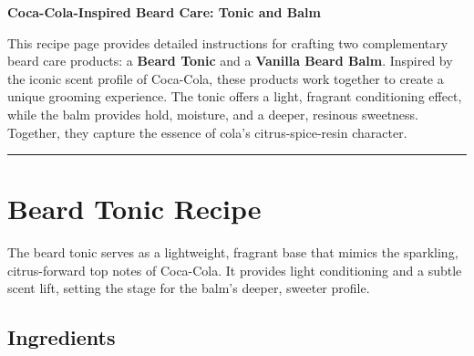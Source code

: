 \documentclass{article}
\begin{document}
\begin{center}
\LARGE\textbf{\textcolor{cola}{Coca-Cola-Inspired Beard Care: Tonic and Balm}}
\end{center}

\vspace{1em}

This recipe page provides detailed instructions for crafting two complementary beard care products: a \textbf{Beard Tonic} and a \textbf{Vanilla Beard Balm}. Inspired by the iconic scent profile of Coca-Cola, these products work together to create a unique grooming experience. The tonic offers a light, fragrant conditioning effect, while the balm provides hold, moisture, and a deeper, resinous sweetness. Together, they capture the essence of cola's citrus-spice-resin character.

\vspace{1em}
\hrule
\vspace{1em}

\section*{Beard Tonic Recipe}

The beard tonic serves as a lightweight, fragrant base that mimics the sparkling, citrus-forward top notes of Coca-Cola. It provides light conditioning and a subtle scent lift, setting the stage for the balm's deeper, sweeter profile.

\subsection*{Ingredients}
\end{document}
